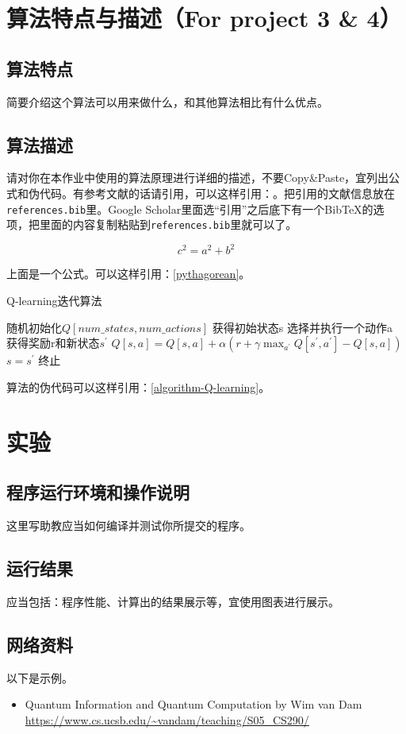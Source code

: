 \documentclass{ctexrep}
\begin{document}
\chapter{算法特点与描述（For project 3 \& 4）}

\section{算法特点}

简要介绍这个算法可以用来做什么，和其他算法相比有什么优点。

\section{算法描述}

请对你在本作业中使用的算法原理进行详细的描述，不要Copy\&Paste，宜列出公式和伪代码。有参考文献的话请引用，可以这样引用：\cite{bertsekas2003convex}。把引用的文献信息放在\texttt{references.bib}里。Google Scholar里面选“引用”之后底下有一个BibTeX的选项，把里面的内容复制粘贴到\texttt{references.bib}里就可以了。

\begin{equation}\label{pythagorean}
	c^2 = a^2 + b^2
\end{equation}

上面是一个公式。可以这样引用：\autoref{pythagorean}。

\begin{algorithm}
	\caption{Q-learning迭代算法}
	\label{algorithm-Q-learning}
	\begin{algorithmic}
		\STATE 随机初始化$ Q[num\_states, num\_actions] $
		\STATE 获得初始状态s
		\REPEAT
		\STATE 选择并执行一个动作a
		\STATE 获得奖励r和新状态$ s^{'} $
		\STATE $ Q[s, a] = Q[s, a] + \alpha(r +　\gamma \max_{a^{'}}Q[s^{'}, a^{'}] - Q[s, a]) $
		\STATE $ s = s^{'} $
		\UNTIL 终止		
	\end{algorithmic}		
\end{algorithm}	

算法的伪代码可以这样引用：\autoref{algorithm-Q-learning}。

\chapter{实验}

\section{程序运行环境和操作说明}

这里写助教应当如何编译并测试你所提交的程序。

\section{运行结果}

应当包括：程序性能、计算出的结果展示等，宜使用图表进行展示。



\section*{网络资料}

以下是示例。

\begin{itemize}
	\item Quantum Information and Quantum Computation by Wim van Dam \url{https://www.cs.ucsb.edu/~vandam/teaching/S05_CS290/}	
\end{itemize}
\end{document}
